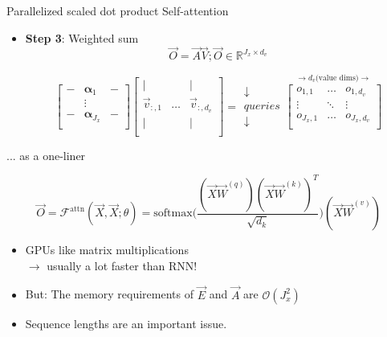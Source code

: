 \documentclass[11pt,compress,t,notes=noshow, xcolor=table]{beamer}
\begin{document}

\begin{vbframe}{Parallelized scaled dot product Self-attention}

\vfill

\begin{itemize}
\item \textbf{Step 3}: Weighted sum
$$\vec {O} = \vec {A} \vec {V}; \vec O \in \mathbb{R}^{J_x \times d_v}$$

$$
\begin{bmatrix} 
- & \boldsymbol \alpha_1  & -  \\
& \vdots & \\
-  & \boldsymbol \alpha_{J_x}  &  -  \\
\end{bmatrix}  
\begin{bmatrix} 
\lvert &  & \lvert  \\
\vec {v}_{:,1} & \ldots & \vec {v}_{:,d_v} \\
\lvert &  & \lvert  \\
\end{bmatrix}
=
\begin{matrix} \downarrow \\ queries \\ \downarrow \end{matrix}
	\overset{\rightarrow d_v \text{(value dims)} \rightarrow}{
\begin{bmatrix}
o_{1,1} & \ldots & o_{1,d_v} \\
\vdots & \ddots & \vdots \\
o_{J_x,1} & \ldots & o_{J_x,d_v} \\
\end{bmatrix}}
$$
\end{itemize}

\vfill

\end{vbframe}


\begin{vbframe}{... as a one-liner}

\vfill

\large
$$ \vec O = \mathcal{F}^\mathrm{attn}(\vec X, \vec X; \theta) = \mathrm{softmax}\Big(\frac{(\vec X\vec W^{(q)} ) (\vec X\vec W^{(k)} )^T}{\sqrt{d_k}}\Big)(\vec X\vec W^{(v)} ) $$
\begin{itemize}
\item GPUs like matrix multiplications\\$\rightarrow$ usually a lot faster than RNN!
\item But: The memory requirements of $\vec E$ and $\vec A$ are $\mathcal{O}(J_x^2)$
\item Sequence lengths are an important issue.
\end{itemize}

\vfill

\end{vbframe}
\end{document}
